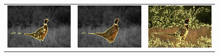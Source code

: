 \documentclass[smallextended]{svjour3}       %
\begin{document}
{{\begin{figure}[hp!]
\begin{tabular}{ccc}
		\includegraphics[scale=0.2]{images/segmentation/bc/bird/gc-seg.png} &
		\includegraphics[scale=0.2]{images/segmentation/bc/bird/corrected-seg.png} &
		\includegraphics[scale=0.2]{images/segmentation/schoenemann/bird/bird-seg.png}\\						

\end{tabular}
\end{figure}}}
\end{document}
